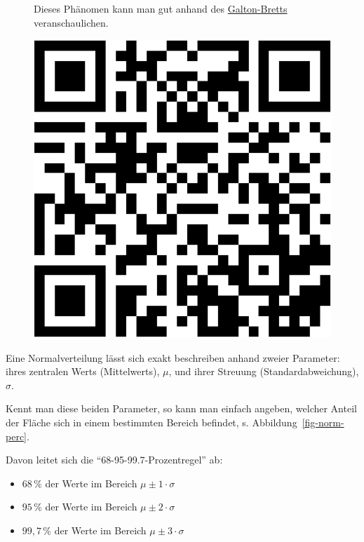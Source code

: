 \documentclass[
  letterpaper,
  oneside,
  open=any]{scrbook}
\providecommand{\tightlist}{%
  \setlength{\itemsep}{0pt}\setlength{\parskip}{0pt}}\usepackage{longtable,booktabs,array}
\theoremstyle{definition}
\theoremstyle{definition}
\theoremstyle{definition}
\theoremstyle{remark}
\begin{document}
\begin{figure}

\begin{minipage}{0.80\linewidth}
Dieses Phänomen kann man gut anhand des
\href{https://www.youtube.com/watch?v=3m4bxse2JEQ}{Galton-Bretts}
veranschaulichen.\end{minipage}%
%
\begin{minipage}{0.20\linewidth}

\begin{center}
\includegraphics[width=0.75\linewidth,height=\textheight,keepaspectratio]{040-verbildlichen_files/figure-pdf/unnamed-chunk-16-1.pdf}
\end{center}

\end{minipage}%

\end{figure}%

Eine Normalverteilung lässt sich exakt beschreiben anhand zweier
Parameter: ihres zentralen Werts (Mittelwerts), \(\mu\), und ihrer
Streuung (Standardabweichung), \(\sigma\).

Kennt man diese beiden Parameter, so kann man einfach angeben, welcher
Anteil der Fläche sich in einem bestimmten Bereich befindet, s.
Abbildung~\ref{fig-norm-perc}.

Davon leitet sich die \enquote{68-95-99.7-Prozentregel} ab:

\begin{itemize}
\tightlist
\item
  \(68\,\%\) der Werte im Bereich \(\mu\pm 1 \cdot \sigma\)
\item
  \(95\,\%\) der Werte im Bereich \(\mu\pm 2 \cdot \sigma\)
\item
  \(99{,}7\,\%\) der Werte im Bereich \(\mu\pm 3 \cdot \sigma\)
\end{itemize}
\end{document}
